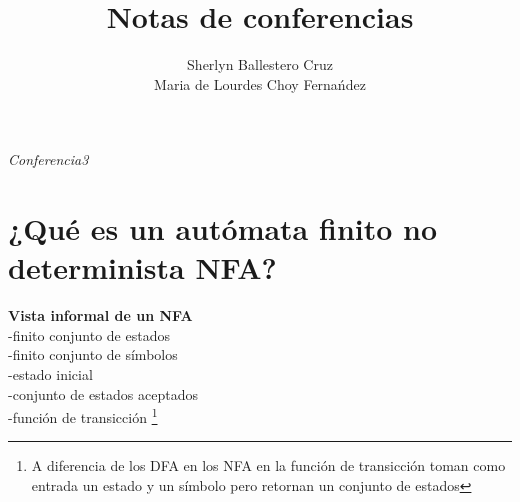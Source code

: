\documentclass[12pt,a4paper]{article}
\title{Notas de conferencias}
\author{Sherlyn Ballestero Cruz \\ Maria de Lourdes Choy Ferna\'ndez}
\begin{document}
\maketitle
\newpage
\pagestyle{myheadings}
\textit{Conferencia3}\\
\section{¿Qu\'e es un aut\'omata finito no determinista NFA?\\}  
\textbf{Vista informal de un NFA}\\
-finito conjunto de estados\\
-finito conjunto de s\'imbolos\\
-estado inicial\\
-conjunto de estados aceptados\\
-funci\'on de transicci\'on  \footnote{A diferencia de los DFA en  los NFA en la funci\'on de transicci\'on toman como entrada un estado y un s\'imbolo pero retornan un conjunto de estados }\\
\end{document}
